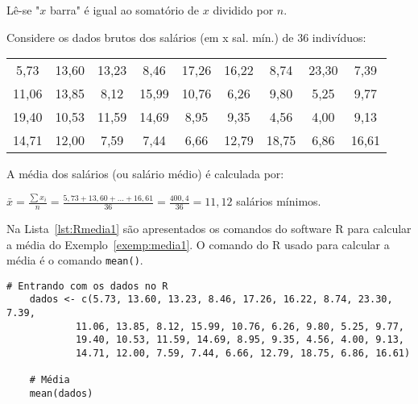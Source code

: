 \documentclass[11pt,fleqn]{book} %
\begin{document}
Lê-se "$x$ barra" é igual ao somatório de $x$ dividido por $n$. \\


\begin{example} \label{exemp:media1}

Considere os dados brutos dos salários (em x sal. mín.) de 36 indivíduos:
	
	\begin{center} \label{dadosbrutossalarios}
	\begin{tabular}{c c c c c c c c c}
	\hline
	5,73  &  13,60  &  13,23  &  8,46  &  17,26  &  16,22  &  8,74  &  23,30  &  7,39 \\
	11,06  &  13,85  &  8,12  &  15,99  &  10,76  &  6,26  &  9,80  &  5,25  &  9,77 \\
	19,40  &  10,53  &  11,59  &  14,69  &  8,95  &  9,35  &  4,56  &  4,00  &  9,13 \\
	14,71  &  12,00  &  7,59  &  7,44  &  6,66  &  12,79  &  18,75  &  6,86  &  16,61 \\
	\hline
	\end{tabular}
	\end{center}
	
A média dos salários (ou salário médio) é calculada por: \\

\begin{center}
$\displaystyle \bar{x}=\frac{\sum{x_i}}{n}=\frac{5,73+13,60+...+16,61}{36}=\frac{400,4}{36}=11,12$ salários mínimos.
\end{center}


\end{example}

\vspace{0,3cm}

Na Lista~\ref{lst:Rmedia1} são apresentados os comandos do software R para calcular a média do Exemplo~\ref{exemp:media1}. O comando do R usado para calcular a média é o comando \texttt{mean()}.\\

\begin{scriptsize}
	\estiloR
	\begin{lstlisting}[caption={Comandos do software R}, label=lst:Rmedia1]
	# Entrando com os dados no R
	dados <- c(5.73, 13.60, 13.23, 8.46, 17.26, 16.22, 8.74, 23.30, 7.39,
			11.06, 13.85, 8.12, 15.99, 10.76, 6.26, 9.80, 5.25, 9.77,
			19.40, 10.53, 11.59, 14.69, 8.95, 9.35, 4.56, 4.00, 9.13,
			14.71, 12.00, 7.59, 7.44, 6.66, 12.79, 18.75, 6.86, 16.61)

	# Média
	mean(dados)

	\end{lstlisting}
\end{scriptsize}
\end{document}
